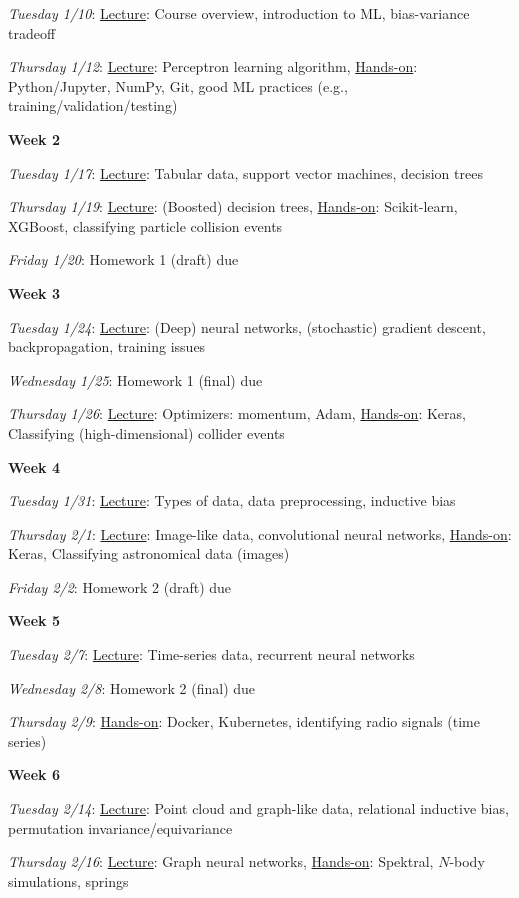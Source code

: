 \documentclass[12pt]{article}
\begin{document}
\emph{Tuesday 1/10}: \underline{Lecture}: Course overview, introduction to ML, bias-variance tradeoff

\emph{Thursday 1/12}: \underline{Lecture}: Perceptron learning algorithm, \underline{Hands-on}: Python/Jupyter, NumPy, Git, good ML practices (e.g., training/validation/testing)

\noindent\textbf{Week 2}

\emph{Tuesday 1/17}: \underline{Lecture}: Tabular data, support vector machines, decision trees

\emph{Thursday 1/19}: \underline{Lecture}: (Boosted) decision trees, \underline{Hands-on}: Scikit-learn, XGBoost, classifying particle collision events

\emph{Friday 1/20}: Homework 1 (draft) due

\noindent\textbf{Week 3}

\emph{Tuesday 1/24}: \underline{Lecture}: (Deep) neural networks, (stochastic) gradient descent, backpropagation, training issues

\emph{Wednesday 1/25}: Homework 1 (final) due

\emph{Thursday 1/26}: \underline{Lecture}: Optimizers: momentum, Adam, \underline{Hands-on}: Keras, Classifying (high-dimensional) collider events

\noindent\textbf{Week 4}

\emph{Tuesday 1/31}: \underline{Lecture}: Types of data, data preprocessing, inductive bias

\emph{Thursday 2/1}: \underline{Lecture}: Image-like data, convolutional neural networks, \underline{Hands-on}: Keras, Classifying astronomical data (images)

\emph{Friday 2/2}: Homework 2 (draft) due

\noindent\textbf{Week 5}

\emph{Tuesday 2/7}: \underline{Lecture}: Time-series data, recurrent neural networks

\emph{Wednesday 2/8}: Homework 2 (final) due

\emph{Thursday 2/9}: \underline{Hands-on}: Docker, Kubernetes, identifying radio signals (time series)

\noindent\textbf{Week 6}

\emph{Tuesday 2/14}: \underline{Lecture}: Point cloud and graph-like data, relational inductive bias, permutation invariance/equivariance

\emph{Thursday 2/16}: \underline{Lecture}: Graph neural networks, \underline{Hands-on}: Spektral, $N$-body simulations, springs
\end{document}
